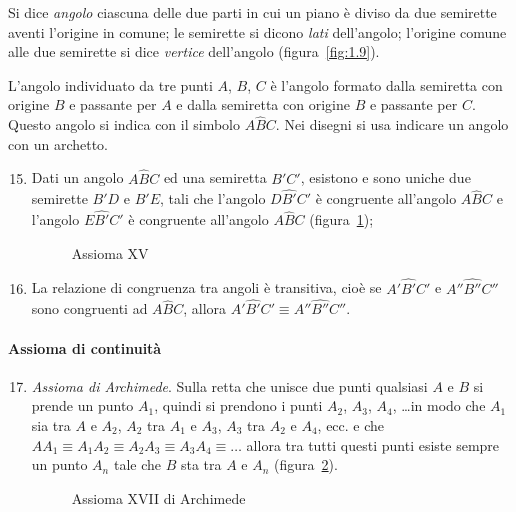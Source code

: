 \begin{center}
 
\end{center}

\begin{definizione}
Si dice \emph{angolo} ciascuna delle due parti in cui un piano è diviso da due semirette aventi l'origine in comune; le semirette si dicono \emph{lati} dell'angolo; l'origine comune alle due semirette si dice \emph{vertice} dell'angolo (figura~\ref{fig:1.9}).
\end{definizione}
\begin{figure*}[b,t,h]
\centering  
\caption{Le semirette $r$ e $s$, aventi l'origine $V$ comune individuano due regioni del piano dette angolo.}\label{fig:1.9}
\end{figure*}

L'angolo individuato da tre punti $A$, $B$, $C$ è l'angolo formato dalla semiretta con origine $B$ e passante per $A$ e dalla semiretta con origine $B$ e passante per $C$. Questo angolo si indica con il simbolo $A\widehat{B}C$. Nei disegni si usa indicare un angolo con un archetto.

\begin{enumerate}[label=\Roman{*}.]
\setcounter{enumi}{14}
\item Dati un angolo $A\widehat{B}C$ ed una semiretta $B'C'$, esistono e sono uniche due semirette $B'D$ e $B'E$, tali che l'angolo $D\widehat{B'}C'$ è congruente all'angolo $A\widehat{B}C$ e l'angolo $E\widehat{B'}C'$ è congruente all'angolo $A\widehat{B}C$ (figura~\ref{fig:1.10});
\begin{figure}[b,t,h]
 \centering 
 \caption{Assioma XV}\label{fig:1.10}
\end{figure}
\item La relazione di congruenza tra angoli è transitiva, cioè se  $A'\widehat{B'}C'$ e  $A''\widehat{B''}C''$ sono congruenti ad $A\widehat{B}C$, allora  $A'\widehat{B'}C' \equiv A''\widehat{B''}C''$.
\end{enumerate}

\paragraph{Assioma di continuità}

\begin{enumerate}[label=\Roman{*}.]
\setcounter{enumi}{16}
\item \emph{Assioma di Archimede}. Sulla retta che unisce due punti qualsiasi $A$ e $B$ si prende un punto $A_1$, quindi si prendono i punti $A_2$, $A_3$, $A_4$, \ldots in modo che $A_1$ sia tra $A$ e $A_2$, $A_2$ tra $A_1$ e $A_3$, $A_3$ tra $A_2$ e $A_4$, ecc. e che  $AA_1\equiv A_1A_2\equiv A_2A_3\equiv A_3A_4\equiv\ldots$ allora tra tutti questi punti esiste sempre un punto $A_n$ tale che $B$ sta tra $A$ e $A_n$ (figura~\ref{fig:1.11}).
\begin{figure}[b,t,h]
 \centering 
 \caption{Assioma XVII di Archimede}\label{fig:1.11}
\end{figure}
\end{enumerate}

